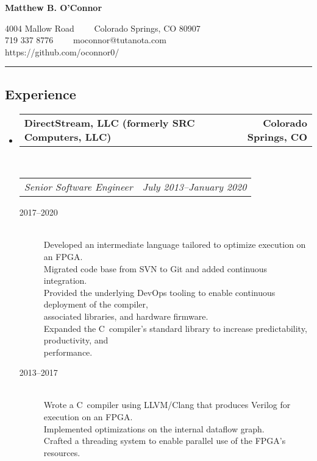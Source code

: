 \documentclass[10pt,letterpaper]{article}
\makeatletter
\newcommand{\headerrow}[2]
{\begin{tabular*}{\linewidth}{l@{\extracolsep{\fill}}r}
  #1 &
  #2 \\
\end{tabular*}}
\newcommand{\CPP}
{C\nolinebreak[4]\hspace{-.05em}\raisebox{.22ex}{\footnotesize\bf ++}}
\makeatother
\begin{document}
\begin{center}
{\LARGE \textbf{Matthew B. O'Connor}}

4004 Mallow Road\ \ \textbullet
\ \ Colorado Springs, CO 80907
\\
719 337 8776\ \ \textbullet
\ \ moconnor@tutanota.com
\\
https://github.com/oconnor0/
\end{center}

\hrule
\vspace{-0.4em}
\subsection*{Experience}

\begin{itemize}
  \parskip=0.1em

  \item
  \headerrow
    {\textbf{DirectStream, LLC (formerly SRC Computers, LLC)}}
    {\textbf{Colorado Springs, CO}}
  \\
  \headerrow
    {\emph{Senior Software Engineer}}
    {\emph{July 2013--January 2020}}
  \begin{description}
    \item[2017--2020] \hfill \\
        Developed an intermediate language tailored to optimize execution on an FPGA. \\
        Migrated code base from SVN to Git and added continuous integration. \\
        Provided the underlying DevOps tooling to enable continuous deployment of the compiler, \\  associated libraries, and hardware firmware. \\
        Expanded the \CPP \  compiler's standard library to increase predictability, productivity, and \\  performance.
    \item[2013--2017] \hfill \\
        Wrote a \CPP \  compiler using LLVM/Clang that produces Verilog for execution on an FPGA. \\
        Implemented optimizations on the internal dataflow graph. \\
        Crafted a threading system to enable parallel use of the FPGA’s resources.
  \end{description}


\end{itemize}
\end{document}
